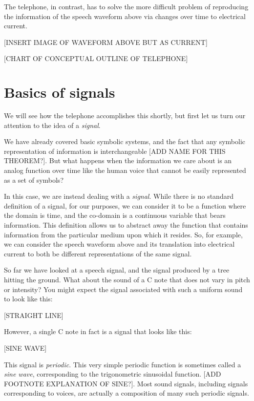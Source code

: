 \documentclass[UTF8]{book}
\begin{document}
\begin{CJK}{UTF8}{gbsn}
The telephone, in contrast, has to solve the more difficult problem of reproducing the information of the speech waveform above via changes over time to electrical current.

[INSERT IMAGE OF WAVEFORM ABOVE BUT AS CURRENT]

[CHART OF CONCEPTUAL OUTLINE OF TELEPHONE]

\section{Basics of signals}

We will see how the telephone accomplishes this shortly, but first let us turn our attention to the idea of a \emph{signal}.

We have already covered basic symbolic systems, and the fact that any symbolic representation of information is interchangeable [ADD NAME FOR THIS THEOREM?]. But what happens when the information we care about is an analog function over time like the human voice that cannot be easily represented as a set of symbols?

In this case, we are instead dealing with a \emph{signal}. While there is no standard definition of a signal, for our purposes, we can consider it to be a function where the domain is time, and the co-domain is a continuous variable that bears information. This definition allows us to abstract away the function that contains information from the particular medium upon which it resides. So, for example, we can consider the speech waveform above and its translation into electrical current to both be different representations of the same signal.

So far we have looked at a speech signal, and the signal produced by a tree hitting the ground. What about the sound of a C note that does not vary in pitch or intensity? You might expect the signal associated with such a uniform sound to look like this:

[STRAIGHT LINE]

However, a single C note in fact is a signal that looks like this:

[SINE WAVE]

This signal is \emph{periodic}. This very simple periodic function is sometimes called a \emph{sine wave}, corresponding to the trigonometric sinusoidal function. [ADD FOOTNOTE EXPLANATION OF SINE?]. Most sound signals, including signals corresponding to voices, are actually a composition of many such periodic signals.


\end{CJK}
\end{document}
